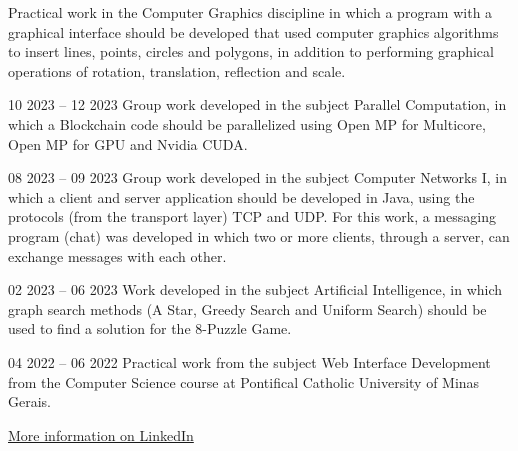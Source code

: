 Practical work in the Computer Graphics discipline in which a program with a graphical interface should be developed that used computer graphics algorithms to insert lines, points, circles and polygons, in addition to performing graphical operations of rotation, translation, reflection and scale.\\
\divider

{
}{10 2023 -- 12 2023}{}
Group work developed in the subject Parallel Computation, in which a Blockchain code should be parallelized using Open MP for Multicore, Open MP for GPU and Nvidia CUDA.\\
\divider

{
}{08 2023 -- 09 2023}{}
Group work developed in the subject Computer Networks I, in which a client and server application should be developed in Java, using the protocols (from the transport layer) TCP and UDP. For this work, a messaging program (chat) was developed in which two or more clients, through a server, can exchange messages with each other.\\
\divider
        
{
}{02 2023 -- 06 2023}{}
Work developed in the subject Artificial Intelligence, in which graph search methods (A Star, Greedy Search and Uniform Search) should be used to find a solution for the 8-Puzzle Game.\\
\divider

{
}{04 2022 -- 06 2022}{}
Practical work from the subject Web Interface Development from the Computer Science course at Pontifical Catholic University of Minas Gerais.\\
\divider

{\large\color{emphasis}\href{https://www.linkedin.com/in/henriquemcc/details/projects/}{More information on LinkedIn}}